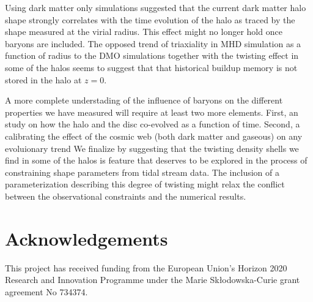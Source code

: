 \documentclass[usenatbib]{mnras}
\begin{document}
Using dark matter only simulations \cite{VeraCiro11} suggested that
the current dark matter halo shape strongly correlates with the time
evolution of the halo as traced by the shape measured at the virial radius. 
This effect might no longer hold once baryons are included. 
The opposed trend of triaxiality in MHD simulation as a function of
radius to the DMO simulations together with the twisting effect in some of 
the halos seems to suggest that that historical buildup memory is not
stored in the halo at $z=0$.


A more complete understading of the influence of baryons on the
different properties we have measured will require at least two more elements.
First, an study on how the halo and the disc co-evolved as a
function of time. Second, a calibrating the effect of the cosmic web
(both dark matter and gaseous) on any evoluionary trend
\citep{2014MNRAS.443.1090F,2017MNRAS.469..594B,2019MNRAS.487.1607G} 
We finalize by suggesting that the twisting density shells we find in
some of the halos is feature that deserves to be explored in the
process of constraining shape parameters from tidal stream data.  The
inclusion of a parameterization describing this degree of twisting
might relax the conflict between the observational constraints and the
numerical results.  


\section*{Acknowledgements}
This project has received funding from the European Union's Horizon
2020 Research and Innovation Programme under the Marie
Sk\l{}odowska-Curie grant agreement No 734374. 

 
 
\end{document}
